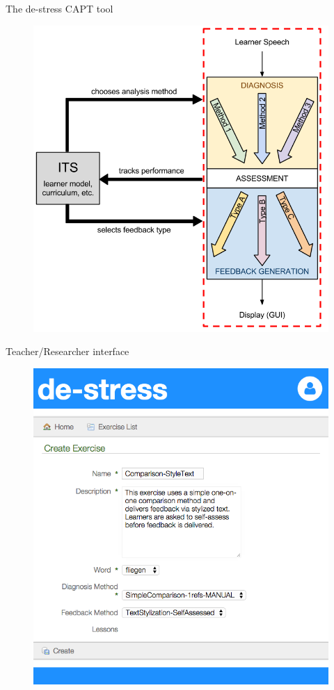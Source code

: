 \documentclass[xcolor={dvipsnames}]{beamer}
\begin{document}
		\begin{frame}{The de-stress CAPT tool}
		\begin{figure}
		\includegraphics[height=.85\textheight]{../img/hourglass-ITS}
		\end{figure}
		\end{frame}
		
		\begin{frame}{Teacher/Researcher interface}
		\begin{figure}
		\includegraphics[height=.85\textheight]{../img/screenshots/TeacherInterface-smaller}
		\end{figure}
		\end{frame}
		
\end{document}
